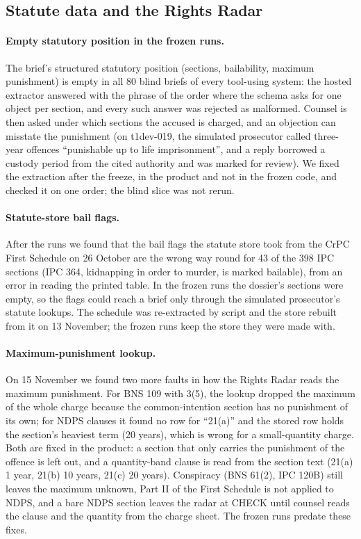 \subsection{Statute data and the Rights Radar}

\paragraph{Empty statutory position in the frozen runs.} The brief's structured statutory position (sections, bailability, maximum punishment) is empty in all 80 blind briefs of every tool-using system: the hosted extractor answered with the phrase of the order where the schema asks for one object per section, and every such answer was rejected as malformed. Counsel is then asked under which sections the accused is charged, and an objection can misstate the punishment (on t1dev-019, the simulated prosecutor called three-year offences ``punishable up to life imprisonment'', and a reply borrowed a custody period from the cited authority and was marked for review). We fixed the extraction after the freeze, in the product and not in the frozen code, and checked it on one order; the blind slice was not rerun.

\paragraph{Statute-store bail flags.} After the runs we found that the bail flags the statute store took from the CrPC First Schedule on 26 October are the wrong way round for 43 of the 398 IPC sections (IPC 364, kidnapping in order to murder, is marked bailable), from an error in reading the printed table. In the frozen runs the dossier's sections were empty, so the flags could reach a brief only through the simulated prosecutor's statute lookups. The schedule was re-extracted by script and the store rebuilt from it on 13 November; the frozen runs keep the store they were made with.

\paragraph{Maximum-punishment lookup.} On 15 November we found two more faults in how the Rights Radar reads the maximum punishment. For BNS 109 with 3(5), the lookup dropped the maximum of the whole charge because the common-intention section has no punishment of its own; for NDPS clauses it found no row for ``21(a)'' and the stored row holds the section's heaviest term (20 years), which is wrong for a small-quantity charge. Both are fixed in the product: a section that only carries the punishment of the offence is left out, and a quantity-band clause is read from the section text (21(a) 1 year, 21(b) 10 years, 21(c) 20 years). Conspiracy (BNS 61(2), IPC 120B) still leaves the maximum unknown, Part II of the First Schedule is not applied to NDPS, and a bare NDPS section leaves the radar at CHECK until counsel reads the clause and the quantity from the charge sheet. The frozen runs predate these fixes.

